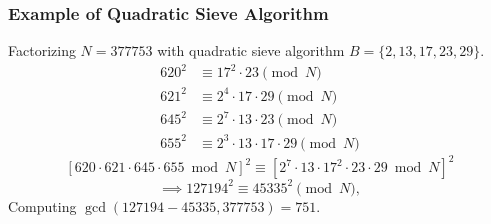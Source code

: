 \begin{frame}\frametitle{Example of Quadratic Sieve Algorithm}
\begin{exampleblock}{Factorizing $N=377753$ with quadratic sieve algorithm}
$B = \{2,13,17,23,29\}$.
\begin{align*}
620^2 &\equiv 17^2\cdot 23 \pmod N\\
621^2 &\equiv 2^4\cdot 17\cdot 29 \pmod N\\
645^2 &\equiv 2^7\cdot 13\cdot 23 \pmod N\\
655^2 &\equiv 2^3\cdot 13\cdot 17\cdot 29 \pmod N
\end{align*}
\[ [620\cdot 621\cdot 645\cdot 655 \bmod N]^2 \equiv [2^7\cdot 13\cdot 17^2\cdot 23\cdot 29\bmod N]^2 \]
\[ \implies 127194^2 \equiv 45335^2 \pmod N,\]
Computing $\gcd(127194-45335,377753)=751$.
\end{exampleblock}
\end{frame}
